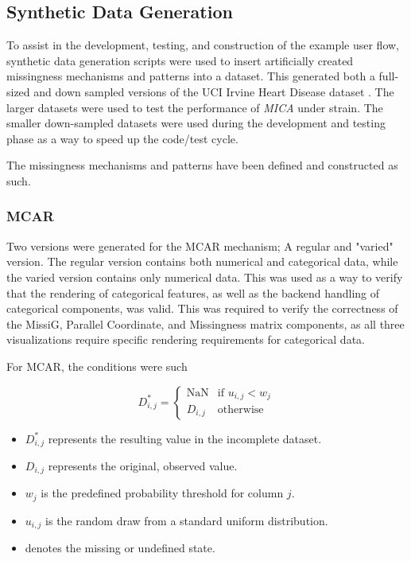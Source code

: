 \documentclass[a4paper, 11pt]{article}
\newcommand{\mica}{\textit{MICA }}
\begin{document}
\subsection{Synthetic Data Generation}

To assist in the development, testing, and construction of the example
user flow, synthetic data generation scripts were used to insert artificially
created missingness mechanisms and patterns into a dataset. This generated both
a full-sized and down sampled versions of the UCI Irvine Heart Disease dataset
\cite{andras_janosi_heart_1989}. The larger datasets were used to test the
performance of \mica under strain. The smaller down-sampled datasets were used
during the development and testing phase as a way to speed up the code/test
cycle. 


The missingness mechanisms and patterns have been defined and constructed as
such.

\subsubsection*{MCAR}
Two versions were generated for the MCAR mechanism; A regular and "varied"
version. The regular version contains both numerical and categorical data, while
the varied version contains only numerical data. This was used as a way to
verify that the rendering of categorical features, as well as the backend handling of
categorical components, was valid. This was required to verify the correctness
of the MissiG, Parallel Coordinate, and Missingness matrix components, as all
three visualizations require specific rendering requirements for categorical
data.

For MCAR, the conditions were such

\begin{equation} 
D_{i,j}^* = 
\begin{cases} 
\text{NaN} & \text{if } u_{i,j} < w_j \\ 
D_{i,j} & \text{otherwise} 
\end{cases}
\end{equation} 

\begin{itemize}
    \item $D_{i,j}^*$ represents the resulting value in the incomplete dataset.
    \item $D_{i,j}$ represents the original, observed value.
    \item $w_j$ is the predefined probability threshold for column $j$.
    \item $u_{i,j}$ is the random draw from a standard uniform distribution.
    \item {} denotes the missing or undefined state.
\end{itemize}
\end{document}
